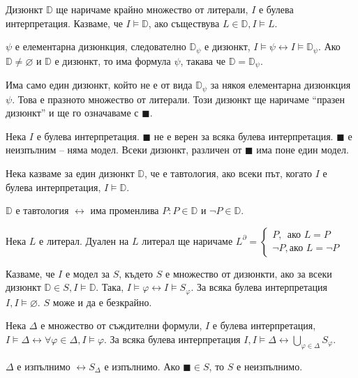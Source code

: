 \documentclass{article}
\begin{document}
\begin{mydef}[Дизюнкт]
Дизюнкт $\mathbb{D}$ ще наричаме крайно множество от литерали, $I$ е булева интерпретация. Казваме, че $I \models \mathbb{D}$, ако съществува $L \in \mathbb{D}, I \models L$.

$\psi$ е елементарна дизюнкция, следователно $\mathbb{D}_\psi$ е дизюнкт, $I \models \psi \longleftrightarrow I \models \mathbb{D}_\psi$. Ако $\mathbb{D} \neq \varnothing$ и $\mathbb{D}$ е дизюнкт, то има формула $\psi$, такава че $\mathbb{D} = \mathbb{D}_\psi$.

\begin{remark}
Има само един дизюнкт, който не е от вида $\mathbb{D}_\psi$ за някоя елементарна дизюнкция $\psi$. Това е празното множество от литерали. Този дизюнкт ще наричаме ``празен дизюнкт'' и ще го означаваме с $\blacksquare$.
\end{remark}

\begin{remark}
Нека $I$ е булева интерпретация. $\blacksquare$ не е верен за всяка булева интерпретация. $\blacksquare$ е неизпълним -- няма модел. Всеки дизюнкт, различен от $\blacksquare$ има поне един модел.
\end{remark}
\end{mydef}

\begin{mydef}[Тавтология]
Нека казваме за един дизюнкт $\mathbb{D}$, че е тавтология, ако всеки път, когато $I$ е булева интерпретация, $I \models \mathbb{D}$.

$\mathbb{D}$ е тавтология $\longleftrightarrow$ има променлива $P: P \in \mathbb{D}$ и $\neg P \in \mathbb{D}$.
\end{mydef}


\begin{mydef}
Нека $L$ е литерал. Дуален на $L$ литерал ще наричаме $L^\partial = \begin{cases}
P, \ \ \text{ако } L = P\\
\neg P, \text{ако } L = \neg P
\end{cases} $
\end{mydef}

\begin{mydef}[Модел]
Казваме, че $I$ е модел за $S$, където $S$ е множество от дизюнкти, ако за всеки дизюнкт $\mathbb{D} \in S, I \models \mathbb{D}$. Така, $I \models \varphi \longleftrightarrow I \models S_\varphi$. За всяка булева интерпретация $I, I \models \varnothing$. $S$ може и да е безкрайно.

Нека $\Delta$ е множество от съждителни формули, $I$ е булева интерпретация, $I \models \Delta \longleftrightarrow \forall \varphi \in \Delta, I \models \varphi$. За всяка булева интерпретация $I, I \models \Delta \longleftrightarrow \underset{\varphi \in \Delta}{\bigcup} S_\varphi$.

\begin{remark}
$\Delta$ е изпълнимо $\longleftrightarrow S_\Delta$  е изпълнимо. Ако $\blacksquare \in S$, то $S$ е неизпълнимо.
\end{remark}
\end{mydef}
\end{document}
